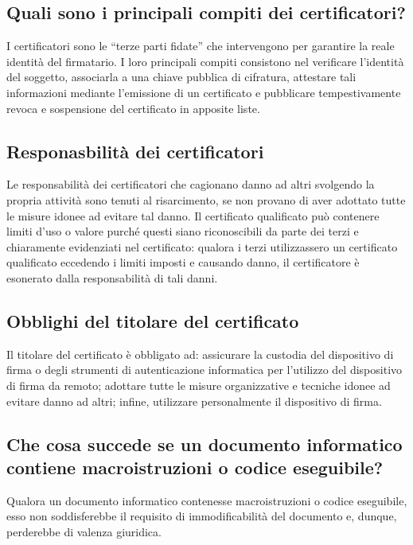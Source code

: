 \subsection{Quali sono i principali compiti dei certificatori?}
I certificatori sono le “terze parti fidate” che intervengono
per garantire la reale identità del firmatario. I loro principali compiti consistono nel
verificare l'identità del soggetto, associarla a una chiave pubblica di cifratura,
attestare tali informazioni mediante l'emissione di un certificato e pubblicare tempestivamente revoca
e sospensione del certificato in apposite liste.


\subsection{Responasbilità dei certificatori}
Le responsabilità dei certificatori che cagionano danno ad altri svolgendo la propria
attività sono tenuti al risarcimento, se non provano di aver adottato tutte
le misure idonee ad evitare tal danno. Il certificato qualificato può contenere limiti
d'uso o valore purché questi siano riconoscibili da parte dei terzi e chiaramente
evidenziati nel certificato: qualora i terzi utilizzassero un certificato qualificato
eccedendo i limiti imposti e causando danno, il certificatore è esonerato dalla responsabilità di tali danni.


\subsection{Obblighi del titolare del certificato}
Il titolare del certificato è obbligato ad: assicurare
la custodia del dispositivo di firma o degli strumenti di autenticazione
informatica per l'utilizzo del dispositivo di firma da remoto;
adottare tutte le misure organizzative e tecniche idonee ad evitare danno ad altri; infine,
utilizzare personalmente il dispositivo di firma.

\subsection{Che cosa succede se un documento informatico contiene macroistruzioni o codice eseguibile?}
Qualora un documento informatico contenesse macroistruzioni o codice eseguibile, esso non soddisferebbe
il requisito di immodificabilità del documento e, dunque, perderebbe di valenza giuridica.

